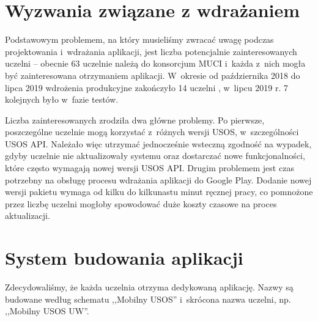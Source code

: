 \documentclass{pracamgr}
\begin{document}
\section{Wyzwania związane z wdrażaniem}

Podstawowym problemem, na który musieliśmy zwracać uwagę podczas projektowania i~wdrażania aplikacji, jest liczba
potencjalnie zainteresowanych uczelni -- obecnie 63 uczelnie należą do konsorcjum MUCI \cite{uczelnie-w-muci} i~każda
z~nich mogła być zainteresowana otrzymaniem aplikacji. W~okresie od października 2018 do lipca 2019 wdrożenia
produkcyjne zakończyło 14 uczelni \cite{news-musosumk, news-musospwste}, w~lipcu 2019 r. 7 kolejnych było w~fazie testów.

Liczba zainteresowanych zrodziła dwa główne problemy. Po pierwsze, poszczególne uczelnie mogą korzystać z~różnych
wersji USOS, w~szczególności USOS API. Należało więc utrzymać jednocześnie wsteczną zgodność na wypadek, gdyby uczelnie
nie aktualizowały systemu oraz dostarczać nowe funkcjonalności, które często wymagają nowej wersji USOS API. Drugim
problemem jest czas potrzebny na obsługę procesu wdrażania aplikacji do Google Play. Dodanie nowej wersji pakietu
wymaga od kilku do kilkunastu minut ręcznej pracy, co pomnożone przez liczbę uczelni mogłoby spowodować duże koszty
czasowe na proces aktualizacji.

\section{System budowania aplikacji}

Zdecydowaliśmy, że każda uczelnia otrzyma dedykowaną aplikację. Nazwy są budowane według schematu ,,Mobilny USOS'' i~skrócona nazwa uczelni, np. ,,Mobilny USOS UW''. 
\end{document}
